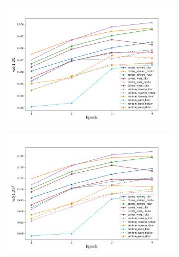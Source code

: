\begin{figure}
\begin{adjustwidth}{-0.2\textwidth}{-0.2\textwidth}
\begin{subfigure}{0.6\textwidth}
            \includegraphics[width=\textwidth]{figs/wa1}
        \end{subfigure}
        \hspace{0cm}
        \begin{subfigure}{0.6\textwidth}
            \includegraphics[width=\textwidth]{figs/wa2}
        \end{subfigure}
        \hspace{0cm}


\end{adjustwidth}
\end{figure}
